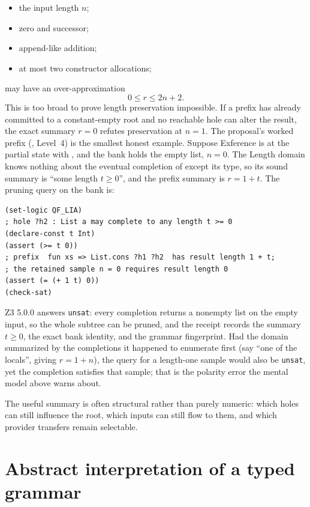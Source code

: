 \documentclass[10pt,letterpaper,oneside]{report}
\newcommand{\code}[1]{\texttt{\detokenize{#1}}}
\newcommand{\unsat}{\texttt{unsat}}
\begin{document}
\begin{itemize}
\item the input length $n$;
\item zero and successor;
\item append-like addition;
\item at most two constructor allocations;
\end{itemize}

may have an over-approximation
\[
  0\le r\le 2n+2.
\]
This is too broad to prove length preservation impossible. If a prefix has already committed to a constant-empty root and no reachable hole can alter the result, the exact summary $r=0$ refutes preservation at $n=1$.
The proposal's worked prefix (\cite{proposal}, Level~4) is the smallest honest example. Suppose Exference is at the partial state \code{fun xs => List.cons ?h1 ?h2} with \code{?h2 : List a}, and the bank holds the empty list, $n=0$. The Length domain knows nothing about the eventual completion of \code{?h2} except its type, so its sound summary is ``some length $t\ge0$'', and the prefix summary is $r=1+t$. The pruning query on the bank is:

\begin{lstlisting}[language=SMTLib,caption={An over-approximate prefix summary refuted by one sample.}]
(set-logic QF_LIA)
; hole ?h2 : List a may complete to any length t >= 0
(declare-const t Int)
(assert (>= t 0))
; prefix  fun xs => List.cons ?h1 ?h2  has result length 1 + t;
; the retained sample n = 0 requires result length 0
(assert (= (+ 1 t) 0))
(check-sat)
\end{lstlisting}

Z3 5.0.0 answers \unsat{}: every completion returns a nonempty list on the empty input, so the whole subtree can be pruned, and the receipt records the summary $t\ge0$, the exact bank identity, and the grammar fingerprint. Had the domain summarized \code{?h2} by the completions it happened to enumerate first (say ``one of the locals'', giving $r=1+n$), the query for a length-one sample would also be \unsat{}, yet the completion \code{?h2 := []} satisfies that sample; that is the polarity error the mental model above warns about.


The useful summary is often structural rather than purely numeric: which holes can still influence the root, which inputs can still flow to them, and which provider transfers remain selectable.

\section{Abstract interpretation of a typed grammar}
\end{document}
